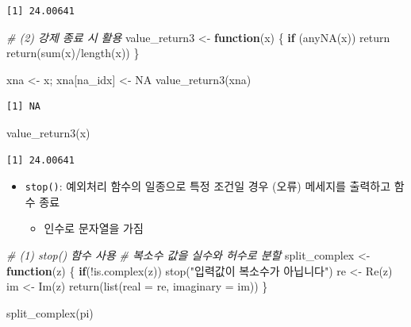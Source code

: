 \documentclass[
  11pt,
]{krantz}
\newenvironment{Shaded}{\begin{snugshade}}{\end{snugshade}}
\newcommand{\AttributeTok}[1]{\textcolor[rgb]{0.61,0.61,0.61}{#1}}
\newcommand{\CommentTok}[1]{\textcolor[rgb]{0.37,0.37,0.37}{\textit{#1}}}
\newcommand{\ConstantTok}[1]{\textcolor[rgb]{0,0,0}{#1}}
\newcommand{\ControlFlowTok}[1]{\textcolor[rgb]{0.27,0.27,0.27}{\textbf{#1}}}
\newcommand{\FunctionTok}[1]{\textcolor[rgb]{0,0,0}{#1}}
\newcommand{\NormalTok}[1]{#1}
\newcommand{\OtherTok}[1]{\textcolor[rgb]{0.37,0.37,0.37}{#1}}
\newcommand{\SpecialCharTok}[1]{\textcolor[rgb]{0,0,0}{#1}}
\newcommand{\StringTok}[1]{\textcolor[rgb]{0.5,0.5,0.5}{#1}}
\providecommand{\tightlist}{%
  \setlength{\itemsep}{0pt}\setlength{\parskip}{0pt}}
\begin{document}
\begin{verbatim}
[1] 24.00641
\end{verbatim}

\begin{Shaded}
\begin{Highlighting}[]
\CommentTok{\# (2) 강제 종료 시 활용}
\NormalTok{value\_return3 }\OtherTok{\textless{}{-}} \ControlFlowTok{function}\NormalTok{(x) \{}
  \ControlFlowTok{if}\NormalTok{ (}\FunctionTok{anyNA}\NormalTok{(x)) return}
  \FunctionTok{return}\NormalTok{(}\FunctionTok{sum}\NormalTok{(x)}\SpecialCharTok{/}\FunctionTok{length}\NormalTok{(x))}
\NormalTok{\}}

\NormalTok{xna }\OtherTok{\textless{}{-}}\NormalTok{ x; xna[na\_idx] }\OtherTok{\textless{}{-}} \ConstantTok{NA}
\FunctionTok{value\_return3}\NormalTok{(xna)}
\end{Highlighting}
\end{Shaded}

\begin{verbatim}
[1] NA
\end{verbatim}

\begin{Shaded}
\begin{Highlighting}[]
\FunctionTok{value\_return3}\NormalTok{(x)}
\end{Highlighting}
\end{Shaded}

\begin{verbatim}
[1] 24.00641
\end{verbatim}

\normalsize

\begin{itemize}
\tightlist
\item
  \texttt{stop()}: 예외처리 함수의 일종으로 특정 조건일 경우 (오류) 메세지를 출력하고 함수 종료

  \begin{itemize}
  \tightlist
  \item
    인수로 문자열을 가짐
  \end{itemize}
\end{itemize}

\footnotesize

\begin{Shaded}
\begin{Highlighting}[]
\CommentTok{\# (1) stop() 함수 사용}
\CommentTok{\# 복소수 값을 실수와 허수로 분할}
\NormalTok{split\_complex }\OtherTok{\textless{}{-}} \ControlFlowTok{function}\NormalTok{(z) \{}
  \ControlFlowTok{if}\NormalTok{(}\SpecialCharTok{!}\FunctionTok{is.complex}\NormalTok{(z)) }
    \FunctionTok{stop}\NormalTok{(}\StringTok{"입력값이 복소수가 아닙니다"}\NormalTok{)}
\NormalTok{  re }\OtherTok{\textless{}{-}} \FunctionTok{Re}\NormalTok{(z)}
\NormalTok{  im }\OtherTok{\textless{}{-}} \FunctionTok{Im}\NormalTok{(z)}
  \FunctionTok{return}\NormalTok{(}\FunctionTok{list}\NormalTok{(}\AttributeTok{real =}\NormalTok{ re, }\AttributeTok{imaginary =}\NormalTok{ im))}
\NormalTok{\}}

\FunctionTok{split\_complex}\NormalTok{(pi)}
\end{Highlighting}
\end{Shaded}
\end{document}
